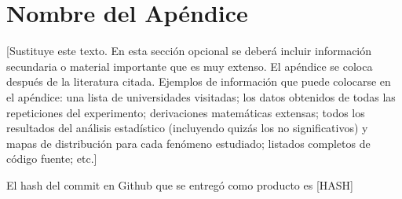 \chapter{Nombre del Apéndice}\label{apendiceA}

[Sustituye este texto.
En esta sección opcional se deberá incluir información secundaria o material importante que es muy extenso. El apéndice se coloca después de la literatura citada. Ejemplos de información que puede colocarse en el apéndice: una lista de universidades visitadas; los datos obtenidos de todas las repeticiones del experimento; derivaciones matemáticas extensas; todos los resultados del análisis estadístico (incluyendo quizás los no significativos) y mapas de distribución para cada fenómeno estudiado; listados completos de código fuente; etc.]

El hash del commit en Github que se entregó como producto es [HASH]
